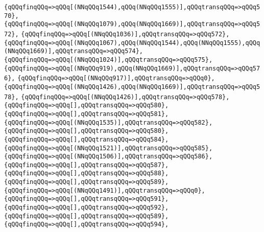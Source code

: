 \verb|{qQQqfinqQQq=>qQQq[(NNqQQq1544),qQQq(NNqQQq1555)],qQQqtransqQQq=>qQQq570},|\newline
\verb|{qQQqfinqQQq=>qQQq[(NNqQQq1079),qQQq(NNqQQq1669)],qQQqtransqQQq=>qQQq572},|\newline
\verb|{qQQqfinqQQq=>qQQq[(NNqQQq1036)],qQQqtransqQQq=>qQQq572},|\newline
\verb|{qQQqfinqQQq=>qQQq[(NNqQQq1067),qQQq(NNqQQq1544),qQQq(NNqQQq1555),qQQq(NNqQQq1669)],qQQqtransqQQq=>qQQq574},|\newline
\verb|{qQQqfinqQQq=>qQQq[(NNqQQq1024)],qQQqtransqQQq=>qQQq575},|\newline
\verb|{qQQqfinqQQq=>qQQq[(NNqQQq919),qQQq(NNqQQq1669)],qQQqtransqQQq=>qQQq576},|\newline
\verb|{qQQqfinqQQq=>qQQq[(NNqQQq917)],qQQqtransqQQq=>qQQq0},|\newline
\verb|{qQQqfinqQQq=>qQQq[(NNqQQq1426),qQQq(NNqQQq1669)],qQQqtransqQQq=>qQQq578},|\newline
\verb|{qQQqfinqQQq=>qQQq[(NNqQQq1426)],qQQqtransqQQq=>qQQq578},|\newline
\verb|{qQQqfinqQQq=>qQQq[],qQQqtransqQQq=>qQQq580},|\newline
\verb|{qQQqfinqQQq=>qQQq[],qQQqtransqQQq=>qQQq581},|\newline
\verb|{qQQqfinqQQq=>qQQq[(NNqQQq1535)],qQQqtransqQQq=>qQQq582},|\newline
\verb|{qQQqfinqQQq=>qQQq[],qQQqtransqQQq=>qQQq580},|\newline
\verb|{qQQqfinqQQq=>qQQq[],qQQqtransqQQq=>qQQq584},|\newline
\verb|{qQQqfinqQQq=>qQQq[(NNqQQq1521)],qQQqtransqQQq=>qQQq585},|\newline
\verb|{qQQqfinqQQq=>qQQq[(NNqQQq1506)],qQQqtransqQQq=>qQQq586},|\newline
\verb|{qQQqfinqQQq=>qQQq[],qQQqtransqQQq=>qQQq587},|\newline
\verb|{qQQqfinqQQq=>qQQq[],qQQqtransqQQq=>qQQq588},|\newline
\verb|{qQQqfinqQQq=>qQQq[],qQQqtransqQQq=>qQQq589},|\newline
\verb|{qQQqfinqQQq=>qQQq[(NNqQQq1491)],qQQqtransqQQq=>qQQq0},|\newline
\verb|{qQQqfinqQQq=>qQQq[],qQQqtransqQQq=>qQQq591},|\newline
\verb|{qQQqfinqQQq=>qQQq[],qQQqtransqQQq=>qQQq592},|\newline
\verb|{qQQqfinqQQq=>qQQq[],qQQqtransqQQq=>qQQq589},|\newline
\verb|{qQQqfinqQQq=>qQQq[],qQQqtransqQQq=>qQQq594},|\newline
